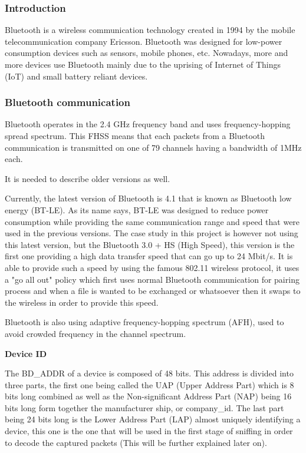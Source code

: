 \subsubsection{Introduction}
Bluetooth is a wireless communication technology created in 1994 by the mobile telecommunication company Ericsson. Bluetooth was designed for low-power consumption devices such as sensors, mobile phones, etc. Nowadays, more and more devices use Bluetooth mainly due to the uprising of Internet of Things (IoT) and small battery reliant devices.

\subsubsection{Bluetooth communication}
Bluetooth operates in the 2.4 GHz frequency band and uses frequency-hopping spread spectrum. This FHSS means that each packets from a Bluetooth communication is transmitted on one of 79 channels having a bandwidth of 1MHz each. 

It is needed to describe older versions as well.

Currently, the latest version of Bluetooth is 4.1 that is known as Bluetooth low energy (BT-LE). As its name says, BT-LE was designed to reduce power consumption while providing the same communication range and speed that were used in the previous versions. \linebreak 
The case study in this project is however not using this latest version, but the Bluetooth 3.0 + HS (High Speed), this version is  the first one providing a high data transfer speed that can go up to 24 Mbit/s. It is able to provide such a speed by using the famous 802.11 wireless protocol, it uses a "go all out" policy which first uses normal Bluetooth communication for pairing process and when a file is wanted to be exchanged or whatsoever then it swaps to the wireless in order to provide this speed.

Bluetooth is also using adaptive frequency-hopping spectrum (AFH), used to avoid crowded frequency in the channel spectrum.


\textbf{Device ID}

The BD\_ADDR of a device is composed of 48 bits. This address is divided into three parts, the first one being called the UAP (Upper Address Part) which is 8 bits long combined as well as the Non-significant Address Part (NAP) being 16 bits long form together the manufacturer ship, or company\_id. The last part being 24 bits long is the Lower Address Part (LAP) almost uniquely identifying a device, this one is the one that will be used in the first stage of sniffing in order to decode the captured packets (This will be further explained later on). 

